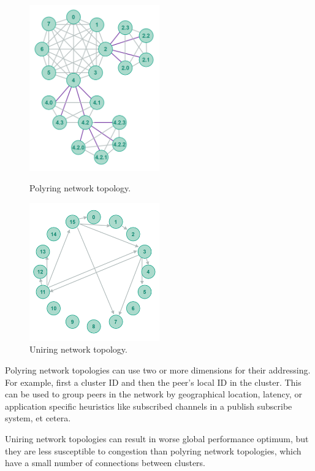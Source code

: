 \begin{figure}
	\includegraphics[width=0.5\textwidth]{pictures/polyring.png}
	\caption{Polyring network topology.\cite{Jenkov_undated-kl}}
	\label{Polyring}
	\includegraphics[width=0.5\textwidth]{pictures/uniring.png}
	\caption{Uniring network topology.\cite{Jenkov_undated-kl}}
	\label{Uniring}
\end{figure}

Polyring network topologies can use two or more dimensions for their addressing. For example, first a cluster ID and then the peer's local ID in the cluster. This can be used to group peers in the network by geographical location, latency, or application specific heuristics like subscribed channels in a publish subscribe system, et cetera.

Uniring network topologies can result in worse global performance optimum, but they are less susceptible to congestion than polyring network topologies, which have a small number of connections between clusters.~\cite{Jenkov_undated-kl}


